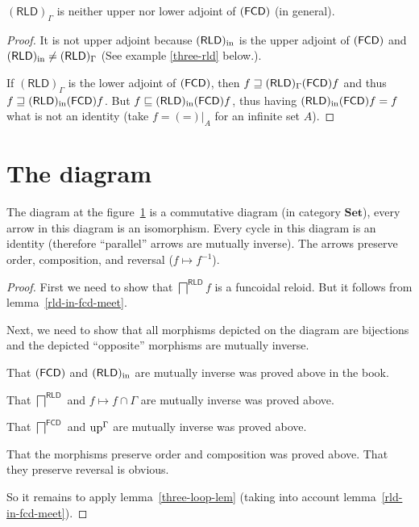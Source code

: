 \begin{prop}
$(\mathsf{RLD})_{\Gamma}$ is neither upper nor lower adjoint of $(\mathsf{FCD})$
(in general).\end{prop}
\begin{proof}
It is not upper adjoint because $(\mathsf{RLD})_{\mathrm{in}}$ is the upper adjoint of
$(\mathsf{FCD})$ and $(\mathsf{RLD})_{\mathrm{in}}\neq(\mathsf{RLD})_{\Gamma}$ (See example
\ref{three-rld} below.).

If $(\mathsf{RLD})_{\Gamma}$ is the lower adjoint of $(\mathsf{FCD})$, then
$f\sqsupseteq(\mathsf{RLD})_{\Gamma}(\mathsf{FCD}) f$ and thus $f\sqsupseteq(\mathsf{RLD})_{\mathrm{in}}(\mathsf{FCD}) f$.
But $f\sqsubseteq(\mathsf{RLD})_{\mathrm{in}}(\mathsf{FCD}) f$, thus having $(\mathsf{RLD})_{\mathrm{in}}(\mathsf{FCD}) f=f$
what is not an identity (take $f={(\mathord{=})}|_{A}$ for an infinite
set $A$).
\end{proof}

\section{The diagram}
\begin{thm}
\label{fcd-diagram}The diagram at the figure~\ref{gamma-dia} is
a commutative diagram (in category $\mathbf{Set}$), every arrow in
this diagram is an isomorphism. Every cycle in this diagram is an
identity (therefore ``parallel'' arrows are mutually inverse). The
arrows preserve order, composition, and reversal ($f\mapsto f^{-1}$).

\begin{figure}[ht]
\caption{\label{gamma-dia}}


\end{figure}
\end{thm}
\begin{proof}
First we need to show that $\bigsqcap^{\mathsf{RLD}}f$ is a funcoidal
reloid. But it follows from lemma~\ref{rld-in-fcd-meet}.

Next, we need to show that all morphisms depicted on the diagram are
bijections and the depicted ``opposite'' morphisms are mutually
inverse.

That $(\mathsf{FCD})$ and $(\mathsf{RLD})_{\mathrm{in}}$ are mutually inverse was proved above
in the book.

That $\bigsqcap^{\mathsf{RLD}}$ and $f\mapsto f\cap\Gamma$ are mutually
inverse was proved above.

That $\bigsqcap^{\mathsf{FCD}}$ and $\operatorname{up}^{\Gamma}$ are mutually
inverse was proved above.

That the morphisms preserve order and composition was proved above.
That they preserve reversal is obvious.

So it remains to apply lemma~\ref{three-loop-lem} (taking into account
lemma~\ref{rld-in-fcd-meet}).
\end{proof}


